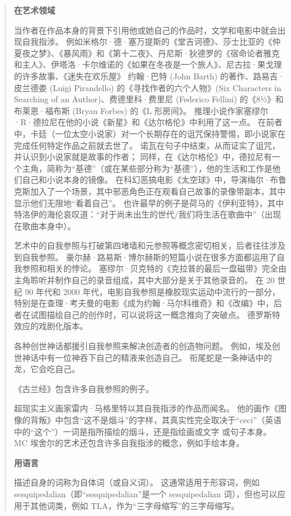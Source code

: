 \begin{quote}
\textbf{在艺术领域}

当作者在作品本身的背景下引用他或她自己的作品时，文学和电影中就会出现自我指涉。
例如米格尔·德·塞万提斯的《堂吉诃德》、莎士比亚的《仲夏夜之梦》、《暴风雨》和《第十二夜》、丹尼斯·狄德罗的《宿命论者雅克和主人》、伊塔洛·卡尔维诺的《如果在冬夜是一个旅人》、尼古拉·果戈理的许多故事、《迷失在欢乐屋》
约翰·巴特 (John Barth) 的著作、路易吉·皮兰德娄 (Luigi Pirandello)
的《寻找作者的六个人物》(Six Characters in Searching of an
Author)、费德里科·费里尼 (Federico Fellini) 的《8½》和布莱恩·福布斯
(Bryan Forbes) 的《L 形房间》。
推理小说作家塞缪尔·R·德拉尼在他的小说《新星》和《达尔格伦》中利用了这一点。
在前者中，卡廷（一位太空小说家）对一个长期存在的诅咒保持警惕，即小说家在完成任何特定作品之前就去世了。
诺瓦在句子中结束，从而证实了诅咒，并认识到小说家就是故事的作者；
同样，在《达尔格伦》中，德拉尼有一个主角，简称为``基德''（或在某些部分称为``基德''），他的生活和工作是他们自己和小说本身的镜像。
在科幻恶搞电影《太空球》中，导演梅尔·布鲁克斯加入了一个场景，其中邪恶角色正在观看自己故事的录像带副本，其中显示他们无限地``看着自己''。
也许最早的例子是荷马的《伊利亚特》，其中特洛伊的海伦哀叹道：``对于尚未出生的世代/我们将生活在歌曲中''（出现在歌曲本身中）。

艺术中的自我参照与打破第四堵墙和元参照等概念密切相关，后者往往涉及到自我参照。
豪尔赫·路易斯·博尔赫斯的短篇小说在很多方面都运用了自我参照和相关的悖论。
塞缪尔·贝克特的《克拉普的最后一盘磁带》完全由主角聆听并制作自己的录音组成，其中大部分是关于其他录音的。
在 20 世纪 90 年代和 2000
年代，电影自我参照是橡胶现实运动中流行的一部分，特别是在查理·考夫曼的电影《成为约翰·马尔科维奇》和《改编》中，后者在试图描绘自己的创作时，可以说将这一概念推向了突破点。
德罗斯特效应的戏剧化版本。

各种创世神话都援引自我参照来解决创造者的创造物问题。
例如，埃及创世神话中有一位神吞下自己的精液来创造自己。
衔尾蛇是一条神话中的龙，它会吃自己。

《古兰经》包含许多自我参照的例子。

超现实主义画家雷内·马格里特以其自我指涉的作品而闻名。
他的画作《图像的背叛》中包含``这不是烟斗''的字样，其真实性完全取决于``ceci''（英语中的``这个''）一词是指所描绘的烟斗，还是指绘画或文字
或句子本身。 MC 埃舍尔的艺术还包含许多自我指涉的概念，例如手绘本身。

\textbf{用语言}

描述自身的词称为自体词（或自义词）。 这通常适用于形容词，例如
sesquipedalian（即``sesquipedalian''是一个 sesquipedalian
词），但也可以应用于其他词类，例如 TLA，作为``三字母缩写''的三字母缩写。


\end{quote}
